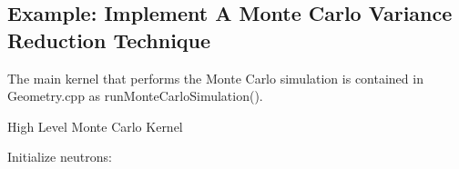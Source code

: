 \documentclass[titlepage]{article}
\begin{document}
\clearpage
\subsection{Example: Implement A Monte Carlo Variance Reduction Technique}
The main kernel that performs the Monte Carlo simulation is contained in Geometry.cpp as runMonteCarloSimulation(). 

\begin{algorithm}

\caption{High Level Monte Carlo Kernel}
\begin{algorithmic}
\STATE Initialize neutrons:

\ENDFOR
\ENDFOR
\end{algorithmic}
\end{algorithm}
\end{document}

